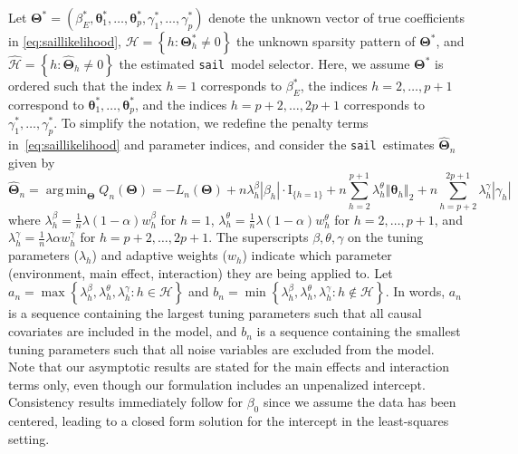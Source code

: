 \documentclass[12pt,letter]{article}\usepackage[]{graphicx}\usepackage[]{color}
\newcommand{\sail}{\texttt{sail}}
\newcommand{\bTheta}{\boldsymbol{\Theta}}
\newcommand{\btheta}{\boldsymbol{\theta}}
\DeclareMathOperator*{\argmin}{arg\,min}
\newcommand{\bThetastar}{\boldsymbol{\Theta}^{*}}
\begin{document}
Let $\bThetastar = (\beta_{E}^*,\btheta_{1}^*,\ldots,\btheta_{p}^*,\gamma_{1}^*,\ldots,\gamma_{p}^*)$ denote the unknown vector of true coefficients in \eqref{eq:saillikelihood}, $\mathcal{H}=\left\lbrace h : \bThetastar_h \neq 0 \right\rbrace$ the unknown sparsity pattern of $\bThetastar$, and $\widehat{\mathcal{H}} =\left\lbrace h : \widehat{\bTheta}_h \neq 0 \right\rbrace$ the estimated \sail ~model selector. Here, we assume $\bThetastar$ is ordered such that the index $h=1$ corresponds to $\beta_E^*$, the indices $h=2, \ldots, p+1$ correspond to $\btheta_{1}^*,\ldots,\btheta_{p}^*$, and the indices $h=p+2, \ldots, 2p+1$ corresponds to $\gamma_{1}^*,\ldots,\gamma_{p}^*$. To simplify the notation, we redefine the penalty terms in~\eqref{eq:saillikelihood} and parameter indices, and consider the \sail ~estimates $\widehat{\bTheta}_n$ given by 
\begin{equation}
\widehat{\bTheta}_n=  \argmin_{\bTheta}Q_n(\bTheta)
=-L_n(\bTheta)+n\lambda_{h}^{\beta}\left|\beta_{h}\right| \cdot \textrm{I}_{\lbrace h=1 \rbrace} + n\sum_{h=2}^{p+1}   \lambda_{h}^{\theta}\left\Vert \btheta_{h}\right\Vert _{2}  +n\sum_{h=p+2}^{2p+1}\lambda_{h}^{\gamma}\left|\gamma_{h}\right|
\end{equation}
where $\lambda_{h}^\beta=\frac{{1}}{n}\lambda(1-\alpha)w_{h}^\beta$ for $h=1$, $\lambda_{h}^{\theta}=\frac{{1}}{n}\lambda(1-\alpha)w_{h}^\theta$ for $h=2, \ldots, p+1$, and $\lambda_{h}^{\gamma}=\frac{{1}}{n}\lambda\alpha w_{h}^\gamma$ for $h=p+2, \ldots, 2p+1$. The superscripts $\beta,\theta, \gamma$ on the tuning parameters ($\lambda_h$) and adaptive weights ($w_h$) indicate which parameter (environment, main effect, interaction) they are being applied to. Let $a_n = \max \left\lbrace \lambda_{h}^\beta, \lambda_{h}^\theta, \lambda_h^\gamma: h \in \mathcal{H}  \right\rbrace$ and $b_n = \min \left\lbrace \lambda_{h}^\beta, \lambda_{h}^\theta, \lambda_h^\gamma: h \notin \mathcal{H}  \right\rbrace$. In words, $a_n$ is a sequence containing the largest tuning parameters such that all causal covariates are included in the model, and $b_n$ is a sequence containing the smallest tuning parameters such that all noise variables are excluded from the model. Note that our asymptotic results are stated for the main effects and interaction terms only, even though our formulation includes an unpenalized intercept. Consistency results immediately follow for $\beta_0$ since we assume the data has been centered, leading to a closed form solution for the intercept in the least-squares setting. 
\end{document}
